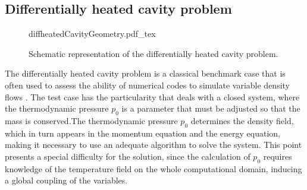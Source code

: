 \subsection{Differentially heated cavity problem}\label{ss:DHC}
\begin{figure}[bt]
	\begin{center}
		\def\svgwidth{0.53\textwidth}
		{diffheatedCavityGeometry.pdf_tex}
		\caption{Schematic representation of the differentially heated cavity problem.}
		\label{DHCGeom}
	\end{center}
\end{figure}
The differentially heated cavity problem is a classical benchmark case that is often used to assess the ability of numerical codes to simulate variable density flows \parencite{paillereComparisonLowMach2000,vierendeelsBenchmarkSolutionsNatural2003,tyliszczakProjectionMethodHighorder2014}.
The test case has the particularity that deals with a closed system, where the thermodynamic pressure $p_0$ is a parameter that must be adjusted so that the mass is conserved.The thermodynamic pressure $p_0$ determines the density field, which in turn appears in the momentum equation and the energy equation, making it necessary to use an adequate algorithm to solve the system. This point presents a special difficulty for the solution, since the calculation of $p_0$ requires knowledge of the temperature field on the whole computational domain, inducing a global coupling of the variables. 

